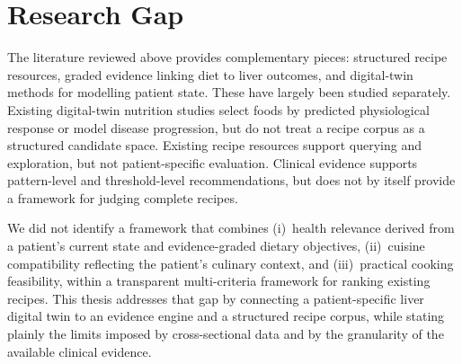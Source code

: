 \section{Research Gap}
\label{sec:lr-gap}

The literature reviewed above provides complementary pieces: structured recipe resources, graded evidence linking diet to liver outcomes, and digital-twin methods for modelling patient state. These have largely been studied separately. Existing digital-twin nutrition studies select foods by predicted physiological response or model disease progression, but do not treat a recipe corpus as a structured candidate space. Existing recipe resources support querying and exploration, but not patient-specific evaluation. Clinical evidence supports pattern-level and threshold-level recommendations, but does not by itself provide a framework for judging complete recipes.

We did not identify a framework that combines (i)~health relevance derived from a patient's current state and evidence-graded dietary objectives, (ii)~cuisine compatibility reflecting the patient's culinary context, and (iii)~practical cooking feasibility, within a transparent multi-criteria framework for ranking existing recipes. This thesis addresses that gap by connecting a patient-specific liver digital twin to an evidence engine and a structured recipe corpus, while stating plainly the limits imposed by cross-sectional data and by the granularity of the available clinical evidence.
